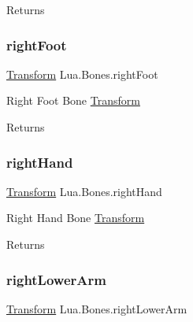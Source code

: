\begin{DoxyReturn}{Returns}

\end{DoxyReturn}
\mbox{\label{class_lua_1_1_bones_ae0707d3e06ec285d2d4634b26b046bbe}} 
\subsubsection{\texorpdfstring{rightFoot}{rightFoot}}
{\footnotesize\ttfamily \mbox{\hyperlink{class_lua_1_1_transform}{Transform}} Lua.\+Bones.\+right\+Foot\hspace{0.3cm}{\ttfamily [get]}}



Right Foot Bone \mbox{\hyperlink{class_lua_1_1_transform}{Transform}} 

\begin{DoxyReturn}{Returns}

\end{DoxyReturn}
\mbox{\label{class_lua_1_1_bones_a33f155d4f1abdedd2c8f514fc9f768dd}} 
\subsubsection{\texorpdfstring{rightHand}{rightHand}}
{\footnotesize\ttfamily \mbox{\hyperlink{class_lua_1_1_transform}{Transform}} Lua.\+Bones.\+right\+Hand\hspace{0.3cm}{\ttfamily [get]}}



Right Hand Bone \mbox{\hyperlink{class_lua_1_1_transform}{Transform}} 

\begin{DoxyReturn}{Returns}

\end{DoxyReturn}
\mbox{\label{class_lua_1_1_bones_aa765e8509188018d417bfae9b678f4b7}} 
\subsubsection{\texorpdfstring{rightLowerArm}{rightLowerArm}}
{\footnotesize\ttfamily \mbox{\hyperlink{class_lua_1_1_transform}{Transform}} Lua.\+Bones.\+right\+Lower\+Arm\hspace{0.3cm}{\ttfamily [get]}}



